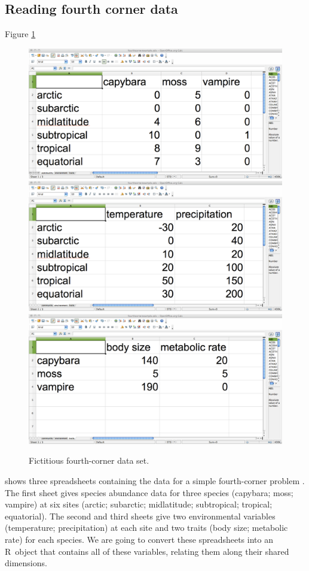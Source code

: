 \documentclass{article}
\newcommand{\R}{{\sf R}}
\numberwithin{exercise}{section}
\begin{document}
\subsection{Reading fourth corner data}

Figure \ref{fig:spreadsheetfc} \begin{figure}
\includegraphics{./readingmultipletables/community.pdf}
\includegraphics{./readingmultipletables/environment.pdf}
\includegraphics{./readingmultipletables/traits.pdf}
\caption{Fictitious fourth-corner data set.}
\label{fig:spreadsheetfc}
\end{figure}shows three spreadsheets containing the data for a simple fourth-corner problem \citep{LegendreEtAl1997}.  The first sheet gives species abundance data for three species (capybara; moss; vampire) at six sites (arctic; subarctic; midlatitude; subtropical; tropical; equatorial).  The second and third sheets give two environmental variables (temperature; precipitation) at each site and two traits (body size; metabolic rate) for each species.  We are going to convert these spreadsheets into an \R\ object that contains all of these variables, relating them along their shared dimensions.
\end{document}
